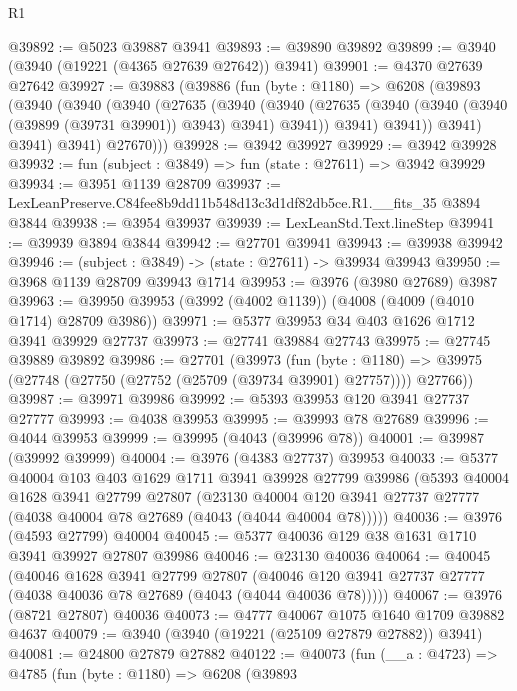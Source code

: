 \begin{lexlean}{R1}
\begin{coremodule}
@39892 := @5023 @39887 @3941
@39893 := @39890 @39892
@39899 := @3940 (@3940 (@19221 (@4365 @27639 @27642)) @3941)
@39901 := @4370 @27639 @27642
@39927 := @39883
    (@39886
      (fun (byte : @1180) =>
      @6208
        (@39893
          (@3940
            (@3940
              (@3940
                (@27635
                  (@3940
                    (@3940
                      (@27635 (@3940 (@3940 (@3940 (@39899 (@39731 @39901)) @3943) @3941) @3941))
                      @3941)
                    @3941))
                @3941)
              @3941)
            @3941)
          @27670)))
@39928 := @3942 @39927
@39929 := @3942 @39928
@39932 := fun (subject : @3849) => fun (state : @27611) => @3942 @39929
@39934 := @3951 @1139 @28709
@39937 := LexLeanPreserve.C84fee8b9dd11b548d13c3d1df82db5ce.R1.__fits_35 @3894 @3844
@39938 := @3954 @39937
@39939 := LexLeanStd.Text.lineStep
@39941 := @39939 @3894 @3844
@39942 := @27701 @39941
@39943 := @39938 @39942
@39946 := (subject : @3849) -> (state : @27611) -> @39934 @39943
@39950 := @3968 @1139 @28709 @39943 @1714
@39953 := @3976 (@3980 @27689) @3987
@39963 := @39950 @39953 (@3992 (@4002 @1139)) (@4008 (@4009 (@4010 @1714) @28709 @3986))
@39971 := @5377 @39953 @34 @403 @1626 @1712 @3941 @39929 @27737
@39973 := @27741 @39884 @27743
@39975 := @27745 @39889 @39892
@39986 := @27701
    (@39973
      (fun (byte : @1180) =>
      @39975 (@27748 (@27750 (@27752 (@25709 (@39734 @39901) @27757)))) @27766))
@39987 := @39971 @39986
@39992 := @5393 @39953 @120 @3941 @27737 @27777
@39993 := @4038 @39953
@39995 := @39993 @78 @27689
@39996 := @4044 @39953
@39999 := @39995 (@4043 (@39996 @78))
@40001 := @39987 (@39992 @39999)
@40004 := @3976 (@4383 @27737) @39953
@40033 := @5377
    @40004
    @103
    @403
    @1629
    @1711
    @3941
    @39928
    @27799
    @39986
    (@5393
      @40004
      @1628
      @3941
      @27799
      @27807
      (@23130 @40004 @120 @3941 @27737 @27777 (@4038 @40004 @78 @27689 (@4043 (@4044 @40004 @78)))))
@40036 := @3976 (@4593 @27799) @40004
@40045 := @5377 @40036 @129 @38 @1631 @1710 @3941 @39927 @27807 @39986
@40046 := @23130 @40036
@40064 := @40045
    (@40046
      @1628
      @3941
      @27799
      @27807
      (@40046 @120 @3941 @27737 @27777 (@4038 @40036 @78 @27689 (@4043 (@4044 @40036 @78)))))
@40067 := @3976 (@8721 @27807) @40036
@40073 := @4777 @40067 @1075 @1640 @1709 @39882 @4637
@40079 := @3940 (@3940 (@19221 (@25109 @27879 @27882)) @3941)
@40081 := @24800 @27879 @27882
@40122 := @40073
    (fun (__a : @4723) =>
    @4785
      (fun (byte : @1180) =>
      @6208
        (@39893

\end{coremodule}
\end{lexlean}
